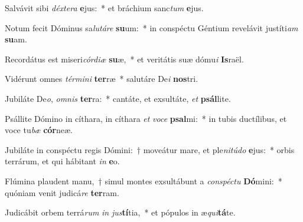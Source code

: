 \item Salvávit sibi \textit{déx}\textit{te}\textit{ra} \textbf{e}jus:~* et bráchium sanc\textit{tum} \textbf{e}jus.
\item Notum fecit Dóminus sa\textit{lu}\textit{tá}\textit{re} \textbf{su}um:~* in conspéctu Géntium revelávit justíti\textit{am} \textbf{su}am.
\item Recordátus est miseri\textit{cór}\textit{di}\textit{æ} \textbf{su}æ,~* et veritátis suæ dómu\textit{i} \textbf{Is}raël.
\item Vidérunt omnes \textit{tér}\textit{mi}\textit{ni} \textbf{ter}ræ~* salutáre De\textit{i} \textbf{nos}tri.
\item Jubiláte De\textit{o}, \textit{om}\textit{nis} \textbf{ter}ra:~* cantáte, et exsultáte, \textit{et} \textbf{psál}lite.
\item Psállite Dómino in cíthara, in cíthara \textit{et} \textit{vo}\textit{ce} \textbf{psal}mi:~* in tubis ductílibus, et voce tu\textit{bæ} \textbf{cór}neæ.
\item Jubiláte in conspéctu regis Dómini:~† moveátur mare, et ple\textit{ni}\textit{tú}\textit{do} \textbf{e}jus:~* orbis terrárum, et qui hábitant \textit{in} \textbf{e}o.
\item Flúmina plaudent manu,~† simul montes exsultábunt a \textit{con}\textit{spéc}\textit{tu} \textbf{Dó}mini:~* quóniam venit judicá\textit{re} \textbf{ter}ram.
\item Judicábit orbem terrá\textit{rum} \textit{in} \textit{jus}\textbf{tí}tia,~* et pópulos in æ\textit{qui}\textbf{tá}te.

